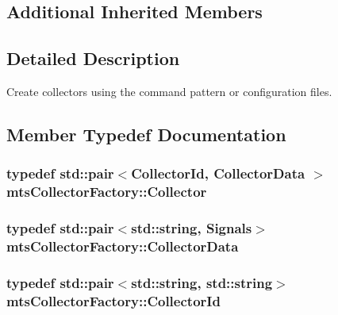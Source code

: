 \subsection*{Additional Inherited Members}


\subsection{Detailed Description}
Create collectors using the command pattern or configuration files. 

\subsection{Member Typedef Documentation}
\hypertarget{classmts_collector_factory_abe3e52266409a03bcf7ba68004ee08d2}{}
\subsubsection[{Collector}]{\setlength{\rightskip}{0pt plus 5cm}typedef std\+::pair$<${\bf Collector\+Id}, {\bf Collector\+Data} $>$ {\bf mts\+Collector\+Factory\+::\+Collector}\hspace{0.3cm}{\ttfamily [protected]}}\label{classmts_collector_factory_abe3e52266409a03bcf7ba68004ee08d2}
\hypertarget{classmts_collector_factory_aca25b6c09f469fe168d3fc99ef7aec8d}{}
\subsubsection[{Collector\+Data}]{\setlength{\rightskip}{0pt plus 5cm}typedef std\+::pair$<$std\+::string, {\bf Signals}$>$ {\bf mts\+Collector\+Factory\+::\+Collector\+Data}\hspace{0.3cm}{\ttfamily [protected]}}\label{classmts_collector_factory_aca25b6c09f469fe168d3fc99ef7aec8d}
\hypertarget{classmts_collector_factory_adaeb0ec5b7392f2a011eb478334e86b6}{}
\subsubsection[{Collector\+Id}]{\setlength{\rightskip}{0pt plus 5cm}typedef std\+::pair$<$std\+::string, std\+::string$>$ {\bf mts\+Collector\+Factory\+::\+Collector\+Id}\hspace{0.3cm}{\ttfamily [protected]}}\label{classmts_collector_factory_adaeb0ec5b7392f2a011eb478334e86b6}
\hypertarget{classmts_collector_factory_ae977f45bdbb0d62035689490d5bf54ee}{}
